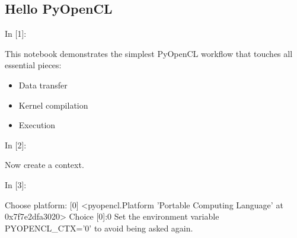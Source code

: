 

    
    \hypertarget{hello-pyopencl}{%
\subsection{Hello PyOpenCL}\label{hello-pyopencl}}

    \begin{BGVerbatim}[commandchars=\\\{\}]
{\color{incolor}In [{\color{incolor}1}]:}    
           
           
        
          
\end{BGVerbatim}

    This notebook demonstrates the simplest PyOpenCL workflow that touches
all essential pieces:

\begin{itemize}
\tightlist
\item
  Data transfer
\item
  Kernel compilation
\item
  Execution
\end{itemize}

    \begin{BGVerbatim}[commandchars=\\\{\}]
{\color{incolor}In [{\color{incolor}2}]:}   
\end{BGVerbatim}

    Now create a context.

    \begin{BGVerbatim}[commandchars=\\\{\}]
{\color{incolor}In [{\color{incolor}3}]:}   
        
          
\end{BGVerbatim}

    \begin{BGVerbatim}[commandchars=\\\{\}]
Choose platform:
[0] <pyopencl.Platform 'Portable Computing Language' at 0x7f7e2dfa3020>
Choice [0]:0
Set the environment variable PYOPENCL\_CTX='0' to avoid being asked again.

    \end{BGVerbatim}

